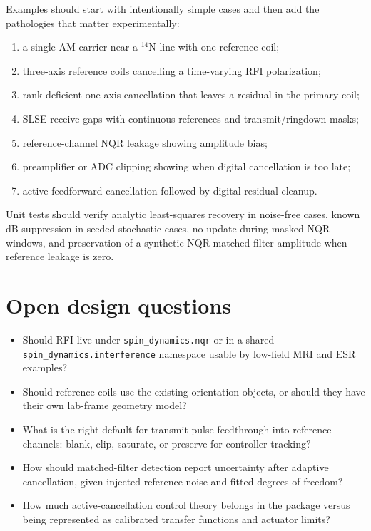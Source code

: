 \documentclass[10pt]{article}
\begin{document}
Examples should start with intentionally simple cases and then add the
pathologies that matter experimentally:
\begin{enumerate}
  \item a single AM carrier near a \({}^{14}\mathrm N\) line with one reference
        coil;
  \item three-axis reference coils cancelling a time-varying RFI polarization;
  \item rank-deficient one-axis cancellation that leaves a residual in the
        primary coil;
  \item SLSE receive gaps with continuous references and transmit/ringdown masks;
  \item reference-channel NQR leakage showing amplitude bias;
  \item preamplifier or ADC clipping showing when digital cancellation is too
        late;
  \item active feedforward cancellation followed by digital residual cleanup.
\end{enumerate}
Unit tests should verify analytic least-squares recovery in noise-free cases,
known dB suppression in seeded stochastic cases, no update during masked NQR
windows, and preservation of a synthetic NQR matched-filter amplitude when
reference leakage is zero.

\section{Open design questions}

\begin{itemize}
  \item Should RFI live under \texttt{spin\_dynamics.nqr} or in a shared
        \texttt{spin\_dynamics.interference} namespace usable by low-field MRI
        and ESR examples?
  \item Should reference coils use the existing orientation objects, or should
        they have their own lab-frame geometry model?
  \item What is the right default for transmit-pulse feedthrough into reference
        channels: blank, clip, saturate, or preserve for controller tracking?
  \item How should matched-filter detection report uncertainty after adaptive
        cancellation, given injected reference noise and fitted degrees of
        freedom?
  \item How much active-cancellation control theory belongs in the package
        versus being represented as calibrated transfer functions and actuator
        limits?
\end{itemize}
\end{document}
